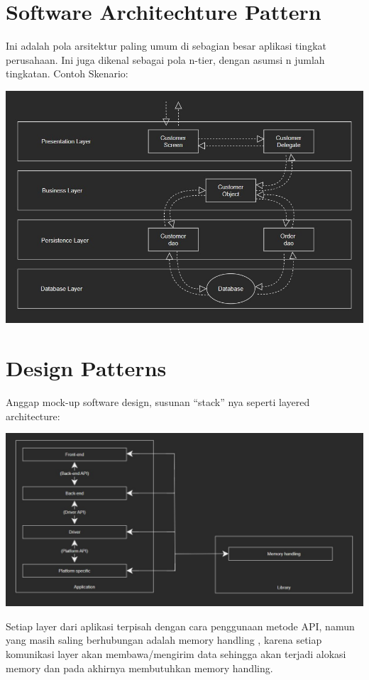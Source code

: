 \section*{Software Architechture Pattern}
Ini adalah pola arsitektur paling umum di sebagian besar aplikasi tingkat perusahaan. Ini juga dikenal sebagai pola n-tier, dengan asumsi n jumlah tingkatan. Contoh Skenario:

\includegraphics[width=\textwidth]{../images/chapter05/Software Architecture Pattern}


\section*{Design Patterns}

Anggap mock-up software design, susunan “stack” nya seperti layered architecture:

\includegraphics[width=\textwidth]{../images/chapter05/Design Pattern}

Setiap layer dari aplikasi terpisah dengan cara penggunaan metode API, namun yang masih saling berhubungan adalah memory handling , karena setiap komunikasi layer akan membawa/mengirim data sehingga akan terjadi alokasi memory dan pada akhirnya membutuhkan memory handling.

